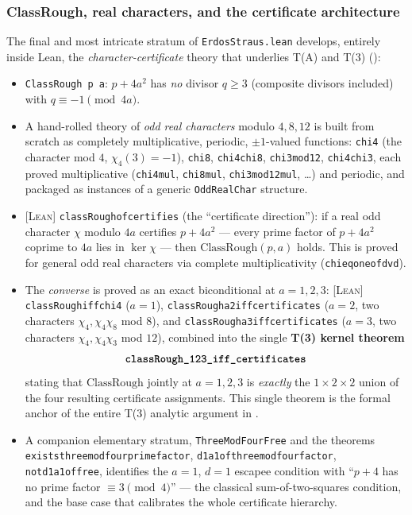 \documentclass[11pt]{article}
\theoremstyle{plain}
\theoremstyle{definition}
\theoremstyle{remark}
\newcommand{\LEAN}{\textcolor{proved}{\textsc{[Lean]}}}
\newcommand{\file}[1]{\texttt{#1}}
\newcommand{\lean}[1]{\texttt{#1}}
\renewcommand{\_}{\textunderscore\allowbreak}
\begin{document}
\subsubsection{ClassRough, real characters, and the certificate architecture}
\label{subsec:classrough-lean}

The final and most intricate stratum of \file{ErdosStraus.lean} develops, entirely inside Lean,
the \emph{character-certificate} theory that underlies T(A) and T(3) ():
\begin{itemize}[leftmargin=1.4em]
  \item \lean{ClassRough p a}: $p+4a^2$ has \emph{no} divisor $q\ge 3$ (composite divisors
        included) with $q\equiv-1\pmod{4a}$.
  \item A hand-rolled theory of \emph{odd real characters} modulo $4,8,12$ is built from
        scratch as completely multiplicative, periodic, $\pm1$-valued functions: \lean{chi4}
        (the character mod $4$, $\chi_4(3)=-1$), \lean{chi8}, \lean{chi4chi8}, \lean{chi3mod12},
        \lean{chi4chi3}, each proved multiplicative (\lean{chi4\_mul}, \lean{chi8\_mul},
        \lean{chi3mod12\_mul}, \dots) and periodic, and packaged as instances of a generic
        \lean{OddRealChar} structure.
  \item \LEAN{} \lean{classRough\_of\_certifies} (the ``certificate direction''): if a real odd
        character $\chi$ modulo $4a$ certifies $p+4a^2$ — every prime factor of $p+4a^2$
        coprime to $4a$ lies in $\ker\chi$ — then $\mathrm{ClassRough}(p,a)$ holds. This is
        proved for general odd real characters via complete multiplicativity
        (\lean{chi\_eq\_one\_of\_dvd}).
  \item The \emph{converse} is proved as an exact biconditional at $a=1,2,3$:
        \LEAN{} \lean{classRough\_iff\_chi4} ($a=1$), \lean{classRough\_a2\_iff\_certificates}
        ($a=2$, two characters $\chi_4,\chi_4\chi_8$ mod $8$), and
        \lean{classRough\_a3\_iff\_certificates} ($a=3$, two characters $\chi_4,\chi_4\chi_3$ mod
        $12$), combined into the single \textbf{T(3) kernel theorem}
        \[
        \textbf{\lean{classRough\_123\_iff\_certificates}}
        \]
        stating that $\mathrm{ClassRough}$ jointly at $a=1,2,3$ is \emph{exactly} the $1\times
        2\times 2$ union of the four resulting certificate assignments. This single theorem is
        the formal anchor of the entire T(3) analytic argument in .
  \item A companion elementary stratum, \lean{ThreeModFourFree} and the theorems
        \lean{exists\_three\_mod\_four\_prime\_factor}, \lean{d1\_a1\_of\_three\_mod\_four\_factor},
        \lean{not\_d1\_a1\_of\_free}, identifies the $a=1$, $d=1$ escapee condition with
        ``$p+4$ has no prime factor $\equiv 3\pmod 4$'' — the classical sum-of-two-squares
        condition, and the base case that calibrates the whole certificate hierarchy.
\end{itemize}
\end{document}
